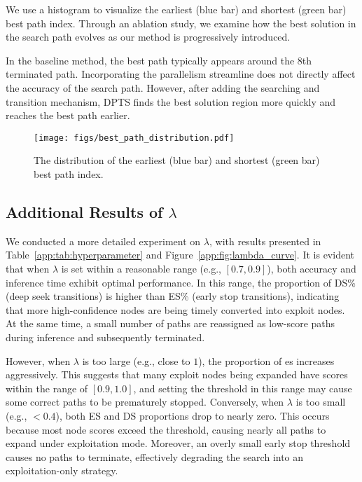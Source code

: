 We use a histogram to visualize the earliest (blue bar) and shortest (green bar) best path index. Through an ablation study, we examine how the best solution in the search path evolves as our method is progressively introduced.

In the baseline method, the best path typically appears around the 8th terminated path. Incorporating the parallelism streamline does not directly affect the accuracy of the search path. However, after adding the searching and transition mechanism, DPTS finds the best solution region more quickly and reaches the best path earlier.

\begin{figure}
    \centering
    \texttt{[image: figs/best\_path\_distribution.pdf]}
    \caption{The distribution of the earliest (blue bar) and shortest (green bar) best path index. }
    \label{fig:best_path_index}
\end{figure}


\subsection{Additional Results of $\lambda$}
\label{sec:app:hyperparameter}

We conducted a more detailed experiment on $\lambda$, with results presented in Table~\ref{app:tab:hyperparameter} and Figure~\ref{app:fig:lambda_curve}. It is evident that when $\lambda$ is set within a reasonable range (e.g., $[0.7,0.9]$), both accuracy and inference time exhibit optimal performance. In this range, the proportion of DS\% (deep seek transitions) is higher than ES\% (early stop transitions), indicating that more high-confidence nodes are being timely converted into exploit nodes. At the same time, a small number of paths are reassigned as low-score paths during inference and subsequently terminated.

However, when $\lambda$ is too large (e.g., close to $1$), the proportion of es increases aggressively. This suggests that many exploit nodes being expanded have scores within the range of $[0.9,1.0]$, and setting the threshold in this range may cause some correct paths to be prematurely stopped. Conversely, when $\lambda$ is too small (e.g., $< 0.4$), both ES and DS proportions drop to nearly zero. This occurs because most node scores exceed the threshold, causing nearly all paths to expand under exploitation mode. Moreover, an overly small early stop threshold causes no paths to terminate, effectively degrading the search into an exploitation-only strategy. 

